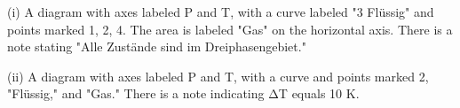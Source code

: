 (i) A diagram with axes labeled P and T, with a curve labeled "3 Flüssig" and points marked 1, 2, 4. The area is labeled "Gas" on the horizontal axis. There is a note stating "Alle Zustände sind im Dreiphasengebiet."

(ii) A diagram with axes labeled P and T, with a curve and points marked 2, "Flüssig," and "Gas." There is a note indicating ΔT equals 10 K.